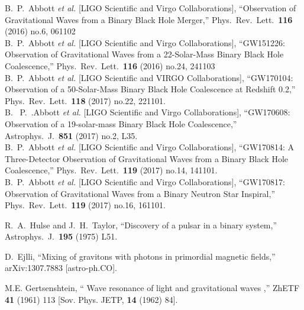 \documentclass[a4paper,11pt]{article}
\begin{document}
 
 
 
 
 
 
 
  \begin{thebibliography}{99}
 
 
  B.~P.~Abbott {\it et al.} [LIGO Scientific and Virgo Collaborations],
  ``Observation of Gravitational Waves from a Binary Black Hole Merger,''
  Phys.\ Rev.\ Lett.\  {\bf 116} (2016) no.6,  061102\\
  B.~P.~Abbott {\it et al.} [LIGO Scientific and Virgo Collaborations],
  ``GW151226: Observation of Gravitational Waves from a 22-Solar-Mass Binary Black Hole Coalescence,''
  Phys.\ Rev.\ Lett.\  {\bf 116} (2016) no.24,  241103  \\
   B.~P.~Abbott {\it et al.} [LIGO Scientific and VIRGO Collaborations],
  ``GW170104: Observation of a 50-Solar-Mass Binary Black Hole Coalescence at Redshift 0.2,''
  Phys.\ Rev.\ Lett.\  {\bf 118} (2017) no.22,  221101.\\
  B.~ P.~.Abbott {\it et al.} [LIGO Scientific and Virgo Collaborations],
  ``GW170608: Observation of a 19-solar-mass Binary Black Hole Coalescence,''
  Astrophys.\ J.\  {\bf 851} (2017) no.2,  L35.\\  
  B.~P.~Abbott {\it et al.} [LIGO Scientific and Virgo Collaborations],
  ``GW170814: A Three-Detector Observation of Gravitational Waves from a Binary Black Hole Coalescence,''
  Phys.\ Rev.\ Lett.\  {\bf 119} (2017) no.14,  141101.\\
 B.~P.~Abbott {\it et al.} [LIGO Scientific and Virgo Collaborations],
  ``GW170817: Observation of Gravitational Waves from a Binary Neutron Star Inspiral,''
  Phys.\ Rev.\ Lett.\  {\bf 119} (2017) no.16,  161101.
  
  
  R.~A.~Hulse and J.~H.~Taylor,
  ``Discovery of a pulsar in a binary system,''
  Astrophys.\ J.\  {\bf 195} (1975) L51.  
  
  
  
  D.~Ejlli,
  ``Mixing of gravitons with photons in primordial magnetic fields,''
  arXiv:1307.7883 [astro-ph.CO].  
  

M.E. Gertsenshtein,   `` Wave resonance of light and gravitational waves ,''
ZhETF {\bf 41} (1961) 113 [Sov. Phys. JETP, {\bf 14} (1962) 84].


\end{thebibliography}
\end{document}
